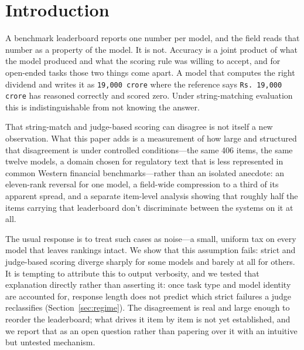 
\section{Introduction}

A benchmark leaderboard reports one number per model, and the field reads that number as a property
of the model. It is not. Accuracy is a joint product of what the model produced and what the scoring
rule was willing to accept, and for open-ended tasks those two things come apart. A model that
computes the right dividend and writes it as \texttt{19,000 crore} where the reference says
\texttt{Rs.\ 19,000 crore} has reasoned correctly and scored zero. Under string-matching evaluation
this is indistinguishable from not knowing the answer.

That string-match and judge-based scoring can disagree is not itself a new observation. What this paper
adds is a measurement of how large and structured that disagreement is under controlled
conditions---the same 406 items, the same twelve models, a domain chosen for regulatory text that is
less represented in common Western financial benchmarks---rather than an isolated anecdote: an
eleven-rank reversal for one model, a field-wide
compression to a third of its apparent spread, and a separate item-level analysis showing that
roughly half the items carrying that leaderboard don't discriminate between the systems on it at all.

The usual response is to treat such cases as noise---a small, uniform tax on every model that leaves
rankings intact. We show that this assumption fails: strict and judge-based scoring diverge sharply
for some models and barely at all for others. It is tempting to attribute this to output verbosity,
and we tested that explanation directly rather than asserting it: once task type and model identity
are accounted for, response length does not predict which strict failures a judge reclassifies
(Section~\ref{sec:regime}). The disagreement is real and large enough to reorder the leaderboard; what
drives it item by item is not yet established, and we report that as an open question rather than
papering over it with an intuitive but untested mechanism.


